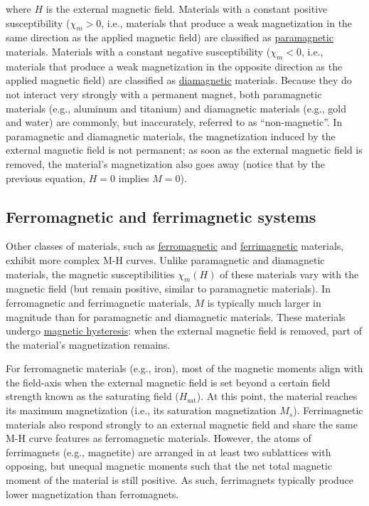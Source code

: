 \documentclass[letterpaper, 12pt]{article}
\begin{document}
where $H$ is the external magnetic field. Materials with a constant positive susceptibility ($\chi_m > 0$, i.e., materials that produce a weak magnetization in the same direction as the applied magnetic field) are classified as \href{https://en.wikipedia.org/wiki/Paramagnetism}{paramagnetic} materials. Materials with a constant negative susceptibility ($\chi_m < 0$, i.e., materials that produce a weak magnetization in the opposite direction as the applied magnetic field) are classified as \href{https://en.wikipedia.org/wiki/Diamagnetism}{diamagnetic} materials. Because they do not interact very strongly with a permanent magnet, both paramagnetic materials (e.g., aluminum and titanium) and diamagnetic materials (e.g., gold and water) are commonly, but inaccurately, referred to as ``non-magnetic''. In paramagnetic and diamagnetic materials, the magnetization induced by the external magnetic field is not permanent; as soon as the external magnetic field is removed, the material’s magnetization also goes away (notice that by the previous equation, $H = 0$ implies $M = 0$).

\subsection*{Ferromagnetic and ferrimagnetic systems}

Other classes of materials, such as \href{https://en.wikipedia.org/wiki/Ferromagnetism}{ferromagnetic} and \href{https://en.wikipedia.org/wiki/Ferrimagnetism}{ferrimagnetic} materials, exhibit more complex M-H curves. Unlike paramagnetic and diamagnetic materials, the magnetic susceptibilities $\chi_m(H)$ of these materials vary with the magnetic field (but remain positive, similar to paramagnetic materials). In ferromagnetic and ferrimagnetic materials, $M$ is typically much larger in magnitude than for paramagnetic and diamagnetic materials. These materials undergo \href{https://en.wikipedia.org/wiki/Magnetic_hysteresis}{magnetic hysteresis}: when the external magnetic field is removed, part of the material’s magnetization remains.

For ferromagnetic materials (e.g., iron), most of the magnetic moments align with the field-axis when the external magnetic field is set beyond a certain field strength known as the saturating field ($H_\text{sat}$). At this point, the material reaches its maximum magnetization (i.e., its saturation magnetization $M_s$). Ferrimagnetic materials also respond strongly to an external magnetic field and share the same M-H curve features as ferromagnetic materials. However, the atoms of ferrimagnets (e.g., magnetite) are arranged in at least two sublattices with opposing, but unequal magnetic moments such that the net total magnetic moment of the material is still positive. As such, ferrimagnets typically produce lower magnetization than ferromagnets.
\end{document}
